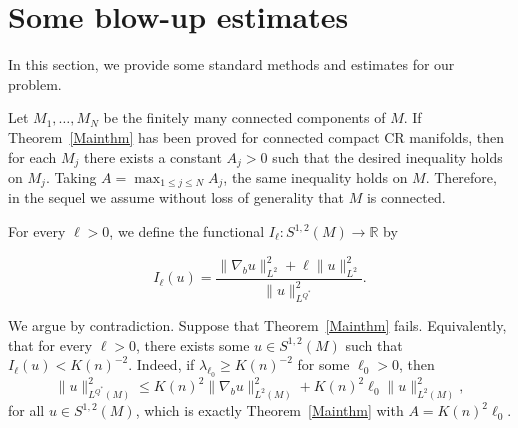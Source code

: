 \documentclass[11pt]{article}
\numberwithin{equation}{section}
\newcounter{problem}
\numberwithin{equation}{section}
\begin{document}
	
	
	
	\section{Some blow-up estimates}\label{sectionblowup}
	In this section, we provide some standard methods and estimates for our problem.
	
	Let \(M_1,\ldots,M_N\) be the finitely many connected components of \(M\). If Theorem~\ref{Mainthm} has been proved for connected compact CR manifolds, then for each \(M_j\) there exists a constant \(A_j>0\) such that the desired inequality holds on \(M_j\). Taking \(A=\max_{1\leq j\leq N}A_j\), the same inequality holds on \(M\). Therefore, in the sequel we assume without loss of generality that \(M\) is connected.
	
	For every \(\ell>0\), we define the functional \(I_\ell: S^{1, 2}(M) \rightarrow \mathbb{R}\) by
	
	\begin{equation}\label{defIalpha}
		I_\ell(u)=\frac{\|\nabla_b u\|_{L^2}^2+\ell\|u\|_{L^2}^2}{\|u\|_{L^{Q^*}}^2}.
	\end{equation}
	
	We argue by contradiction. Suppose that Theorem~\ref{Mainthm} fails. Equivalently, that for every \(\ell>0\), there exists some \(u \in S^{1, 2}(M)\) such that \(I_\ell(u)<K(n)^{-2}\). Indeed, if \(\lambda_{\ell_0}\ge K(n)^{-2}\) for some \(\ell_0>0\), then
	\[
	\|u\|_{L^{Q^*}(M)}^2 \le K(n)^2\|\nabla_bu\|_{L^2(M)}^2 + K(n)^2\ell_0\|u\|_{L^2(M)}^2,
	\]
	for all \(u\in S^{1,2}(M)\), which is exactly Theorem~\ref{Mainthm} with \(A=K(n)^2\ell_0\).
	
\end{document}
